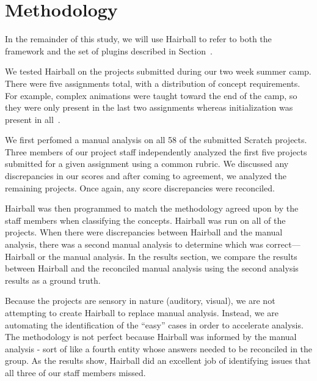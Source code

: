 \section{Methodology} 
In the remainder of this study, we will use Hairball to refer to both the
framework and the set of plugins described in Section~.

We tested Hairball on the projects submitted during our two week summer camp.
There were five assignments total, with a distribution of concept
requirements. For example, complex animations were taught toward the end of the
camp, so they were only present in the last two assignments whereas
initialization was present in all~\cite{Franklin:2013:SBO}.

We first perfomed a manual analysis on all 58 of the submitted Scratch
projects.  Three members of our project staff independently analyzed the first
five projects submitted for a given assignment using a common rubric. We
discussed any discrepancies in our scores and after coming to agreement, we
analyzed the remaining projects.  Once again, any score discrepancies were
reconciled.

Hairball was then programmed to match the methodology agreed upon by the staff
members when classifying the concepts.  Hairball was run on all of the
projects.  When there were discrepancies between Hairball and the manual
analysis, there was a second manual analysis to determine which was
correct---Hairball or the manual analysis.  In the results section, we compare
the results between Hairball and the reconciled manual analysis using the
second analysis results as a ground truth.

Because the projects are sensory in nature (auditory, visual), we are not
attempting to create Hairball to replace manual analysis.  Instead, we are
automating the identification of the ``easy'' cases in order to accelerate
analysis.  The methodology is not perfect because Hairball was informed by the
manual analysis - sort of like a fourth entity whose answers needed to be
reconciled in the group.  As the results show, Hairball did an excellent job of
identifying issues that all three of our staff members missed.
